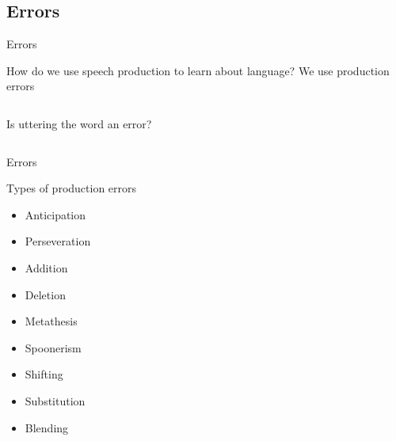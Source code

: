 \documentclass{beamer}
\newcommand{\subonefour}{Errors}
\begin{document}

    \subsection{\subonefour}
      \begin{frame}{\subonefour}
        \begin{block}{How do we use speech production to learn about language?}
          We use production errors
        \end{block}
        \begin{columns}
          \begin{block}{Is uttering the word  an error?}
          \end{block}
        \end{columns}
      \end{frame}

      \begin{frame}{\subonefour}
        \begin{block}{Types of production errors}
          \begin{itemize}
            \item Anticipation
            \item Perseveration
            \item Addition
            \item Deletion
            \item Metathesis
            \item Spoonerism
            \item Shifting
            \item Substitution
            \item Blending
          \end{itemize}
        \end{block}
      \end{frame}
\end{document}
